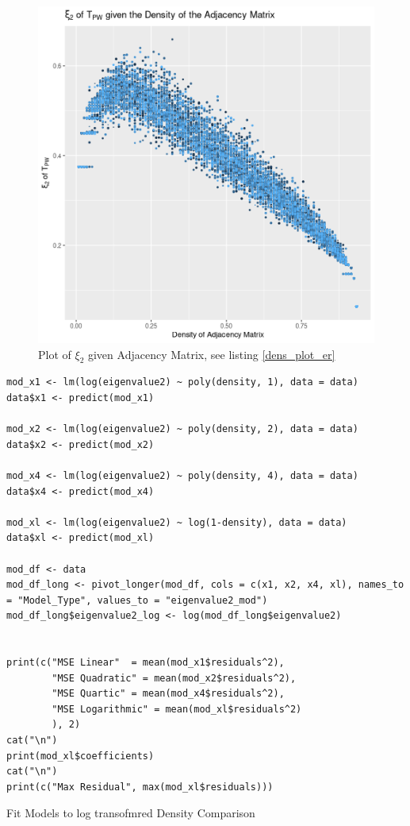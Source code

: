 \documentclass[11pt]{article}
\begin{document}
\begin{figure}[htbp]
\centering
\includegraphics[width=12cm]{media/density_plot.png}
\caption{\label{fig:dens_plot_er}Plot of \(\xi_{2}\) given Adjacency Matrix, see listing \ref{dens_plot_er}}
\end{figure}


\begin{listing}[htbp]
\begin{verbatim}
mod_x1 <- lm(log(eigenvalue2) ~ poly(density, 1), data = data)
data$x1 <- predict(mod_x1)

mod_x2 <- lm(log(eigenvalue2) ~ poly(density, 2), data = data)
data$x2 <- predict(mod_x2)

mod_x4 <- lm(log(eigenvalue2) ~ poly(density, 4), data = data)
data$x4 <- predict(mod_x4)

mod_xl <- lm(log(eigenvalue2) ~ log(1-density), data = data)
data$xl <- predict(mod_xl)

mod_df <- data
mod_df_long <- pivot_longer(mod_df, cols = c(x1, x2, x4, xl), names_to = "Model_Type", values_to = "eigenvalue2_mod")
mod_df_long$eigenvalue2_log <- log(mod_df_long$eigenvalue2)


print(c("MSE Linear"  = mean(mod_x1$residuals^2),
        "MSE Quadratic" = mean(mod_x2$residuals^2),
        "MSE Quartic" = mean(mod_x4$residuals^2),
        "MSE Logarithmic" = mean(mod_xl$residuals^2)
        ), 2)
cat("\n")
print(mod_xl$coefficients)
cat("\n")
print(c("Max Residual", max(mod_xl$residuals)))
\end{verbatim}
\caption{\label{dens_plot_er_mod}Fit Models to log transofmred Density Comparison}
\end{listing}
\end{document}
